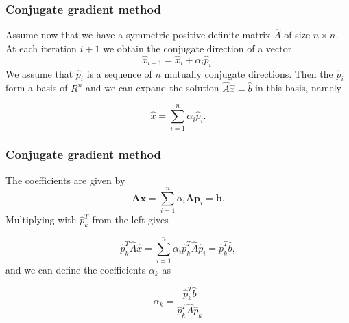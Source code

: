 \documentclass{beamer}
\begin{document}
\begin{frame}
\frametitle{Conjugate gradient method}

\begin{block}{}
Assume now that we have a symmetric positive-definite matrix $\hat{A}$ of size
$n\times n$. At each iteration $i+1$ we obtain the conjugate direction of a vector
\begin{equation*}
\hat{x}_{i+1}=\hat{x}_{i}+\alpha_i\hat{p}_{i}. 
\end{equation*}
We assume that $\hat{p}_{i}$ is a sequence of $n$ mutually conjugate directions. 
Then the $\hat{p}_{i}$  form a basis of $R^n$ and we can expand the solution 
$  \hat{A}\hat{x} = \hat{b}$ in this basis, namely

\begin{equation*}
  \hat{x}  = \sum^{n}_{i=1} \alpha_i \hat{p}_i.
\end{equation*}
\end{block}
\end{frame}

\begin{frame}
\frametitle{Conjugate gradient method}

\begin{block}{}
The coefficients are given by
\begin{equation*}
    \mathbf{A}\mathbf{x} = \sum^{n}_{i=1} \alpha_i \mathbf{A} \mathbf{p}_i = \mathbf{b}.
\end{equation*}
Multiplying with $\hat{p}_k^T$  from the left gives

\begin{equation*}
  \hat{p}_k^T \hat{A}\hat{x} = \sum^{n}_{i=1} \alpha_i\hat{p}_k^T \hat{A}\hat{p}_i= \hat{p}_k^T \hat{b},
\end{equation*}
and we can define the coefficients $\alpha_k$ as

\begin{equation*}
    \alpha_k = \frac{\hat{p}_k^T \hat{b}}{\hat{p}_k^T \hat{A} \hat{p}_k}
\end{equation*}
\end{block}
\end{frame}
\end{document}
